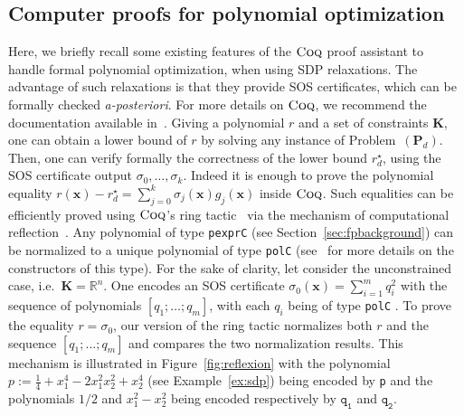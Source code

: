 \documentclass[preprint,fleqn,nocopyrightspace]{sigplanconf}
\newcommand{\code}[1]{\lstinline{#1}}
\newcommand{\R}{\mathbb{R}}
\newcommand{\x}{\mathbf{x}}
\def\P{\mathbf{P}}
\def\K{\mathbf{K}}
\newcommand{\coq}{\text{\sc Coq}}
\theoremstyle{plain}
\begin{document}
\subsection{Computer proofs for polynomial optimization}
\label{sec:coqbackground}
Here, we briefly recall some existing features of the $\coq$ proof assistant to handle formal polynomial optimization, when using SDP relaxations.
The advantage of such relaxations is that they provide SOS certificates, which can be formally checked \textit{a-posteriori}.
For more details on $\coq$, we recommend the
documentation available in~\cite{bertot2004interactive}.
Giving a polynomial $r$ and a set of constraints $\K$, one can obtain a lower bound of $r$ by solving any instance of Problem~$(\P_d)$. Then, one can verify formally the correctness of the lower bound $r_d^\star$, using the SOS certificate output $\sigma_0, \dots, \sigma_k$. Indeed it is enough to prove the polynomial equality $r(\x) - r_d^\star = \sum_{j=0}^k \sigma_j(\x) g_j(\x)$ inside $\coq$. Such equalities can be efficiently proved using $\coq$'s ring tactic~\cite{ring05} via the mechanism of computational reflection~\cite{Boutin97usingreflection}. Any polynomial of type \code{pexprC} (see Section~\ref{sec:fpbackground}) can be normalized to a unique polynomial of type \code{polC} (see~\cite{ring05} for more details on the constructors of this type).
For the sake of clarity, let consider the unconstrained case, i.e.~$\K = \R^n$. One encodes an SOS certificate $\sigma_0(\x) = \sum_{i=1}^m q_i^2$  with the sequence of polynomials $[q_1; \dots; q_m]$, with each $q_i$ being of type \code{polC} . To prove the equality $r = \sigma_0$, our version of the ring tactic normalizes both $r$ and the sequence $[q_1; \dots; q_m]$ and compares the two normalization results. This mechanism is illustrated in Figure~\ref{fig:reflexion} with the polynomial $p := \frac{1}{4} + x_1^4 - 2 x_1^2 x_2^2 + x_2^4$ (see Example~\ref{ex:sdp}) being encoded by \code{p}  and the polynomials $1/2$ and $x_1^2 - x_2^2$ being encoded respectively by $\mathtt{q_1}$ and $\mathtt{q_2}$. 
\end{document}
